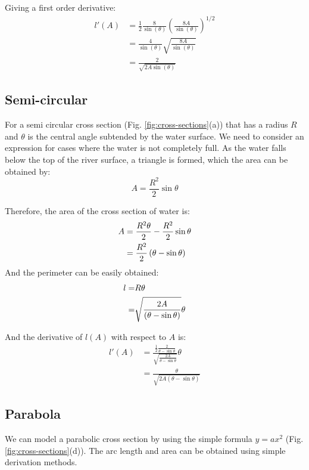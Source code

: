 \documentclass[12pt]{article}
\begin{document}
Giving a first order derivative:
\begin{equation}
    \begin{split}
          l'(A) &= \frac{1}{2}\frac{8}{\sin(\theta)}\left(\frac{8A}{\sin(\theta)}\right)^{1/2}
          \\&=\frac{4}{\sin(\theta)}\sqrt{\frac{8A}{\sin(\theta)}}
          \\&=\frac{2}{\sqrt{2A\sin(\theta)}}
    \end{split}
\end{equation}

\subsection{Semi-circular}
\label{appendix:semi-circular}
For a semi circular cross section (Fig. \ref{fig:cross-sections}(a)) that has a radius $R$ and $\theta$ is the central angle subtended by the water surface. We need to consider an expression for cases where the water is not completely full. As the water falls below the top of the river surface, a triangle is formed, which the area can be obtained by:
\begin{equation}
    A = \frac{R^2}{2} \sin\theta
\end{equation}

Therefore, the area of the cross section of water is:
\begin{align}
    A &=\frac{R^2 \theta}{2} - \frac{R^2}{2}\sin\theta \\
      &= \frac{R^2}{2}\left(\theta - \sin\theta\right) \notag
\end{align}
And the perimeter can be easily obtained:
\begin{align}
    l =& R\theta \\
        =& \sqrt{\frac{2A}{\left(\theta - \sin\theta\right)}}\theta \notag
\end{align}

And the derivative of $l(A)$ with respect to $A$ is:
\begin{equation}
    \begin{split}
         l'(A) &= \frac{\frac{1}{2}\frac{2}{\theta-\sin{\theta}}}{\sqrt{\frac{2A}{\theta-\sin{\theta}}}}\theta
        \\&= \frac{\theta}{\sqrt{2A(\theta-\sin{\theta})}}
    \end{split}
\end{equation}

\subsection{Parabola}
\label{appendix:parabola}
We can model a parabolic cross section by using the simple formula $y = ax^2$ (Fig. \ref{fig:cross-sections}(d)). The arc length and area can be obtained using simple derivation methods.
\end{document}
